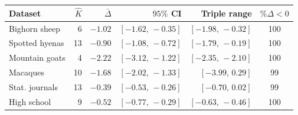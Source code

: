 \begin{tabular}{lrrrrc}
\toprule
Dataset & $\hat K$ & $\bar\Delta$ & $95\%$ CI & Triple range & $\%\Delta<0$ \\
\midrule
Bighorn sheep & 6 & $-1.02$ & $[-1.62,\,-0.35]$ & $[-1.98,\,-0.32]$ & 100\\ 
Spotted hyenas & 13 & $-0.90$ & $[-1.08,\,-0.72]$ & $[-1.79,\,-0.19]$ & 100\\ 
Mountain goats & 4 & $-2.22$ & $[-3.12,\,-1.22]$ & $[-2.35,\,-2.10]$ & 100\\ 
Macaques & 10 & $-1.68$ & $[-2.02,\,-1.33]$ & $[-3.99,\,0.29]$ & 99\\ 
Stat. journals & 13 & $-0.39$ & $[-0.53,\,-0.26]$ & $[-0.70,\,0.02]$ & 99\\ 
High school & 9 & $-0.52$ & $[-0.77,\,-0.29]$ & $[-0.63,\,-0.46]$ & 100\\ 
\bottomrule
\end{tabular}
